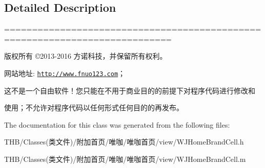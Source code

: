 \subsection{Detailed Description}
============================================================================

版权所有 ©2013-\/2016 方诺科技，并保留所有权利。

网站地址\+: \href{http://www.fnuo123.com}{\tt http\+://www.\+fnuo123.\+com}； 



这不是一个自由软件！您只能在不用于商业目的的前提下对程序代码进行修改和

使用；不允许对程序代码以任何形式任何目的的再发布。 

 

The documentation for this class was generated from the following files\+:\begin{DoxyCompactItemize}
\item 
T\+H\+B/\+Classes(类文件)/附加首页/唯咖/唯咖首页/view/W\+J\+Home\+Brand\+Cell.\+h\item 
T\+H\+B/\+Classes(类文件)/附加首页/唯咖/唯咖首页/view/W\+J\+Home\+Brand\+Cell.\+m\end{DoxyCompactItemize}
